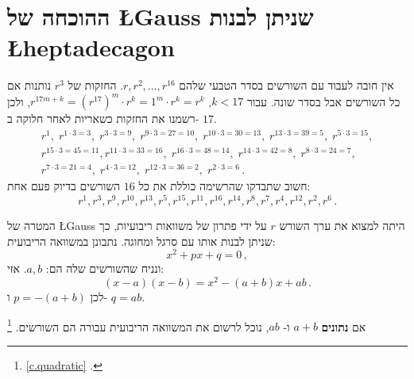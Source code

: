 \section{ההוכחה של 
\L{Gauss}
שניתן לבנות 
\L{heptadecagon}}\label{s.gauss}

אין חובה לעבוד עם השורשים בסדר הטבעי שלהם
$r,r^2,\ldots,r^{16}$. 
החזקות של
$r^3$
נותנות אם כל השורשים אבל בסדר שונה. עבור
$k<17$, $r^{17m+k}=(r^{17})^m\cdot r^k=1^m\cdot r^k=r^k$,
ולכן רשמנו את החזקות כשאריות לאחר חלוקה ב-%
$17$.
\[
\begin{array}{l}
r^1, \;r^{1\cdot 3 =3},\; r^{3\cdot 3=9},\; r^{9\cdot 3=27=10},\; r^{10\cdot 3=30=13},\; r^{13\cdot 3=39=5},\; r^{5\cdot 3=15},\\ r^{15\cdot 3=45=11},
r^{11\cdot 3 =33=16}, \;r^{16\cdot 3=48=14},\; r^{14\cdot 3=42=8},\; r^{8\cdot 3=24=7},\\r^{7\cdot 3=21=4},\; r^{4\cdot 3=12},\; r^{12\cdot 3=36=2},\; r^{2\cdot 3=6}\,.
\end{array}
\]
חשוב שתבדקו שהרשימה כוללת את כל 
$16$
השורשים בדיוק פעם אחת:
\begin{equation}\label{eq.roots}
r^1, r^3, r^9, r^{10}, r^{13}, r^5, r^{15}, r^{11}, r^{16}, r^{14}, r^8, r^7, r^4, r^{12}, r^2, r^6\,.
\end{equation}


המטרה של
\L{Gauss}
היתה למצוא את ערך השורש
$r$
על ידי פתרון של משוואות ריבועיות, כך שניתן לבנות אותו עם סרגל ומחוגה. נתבונן במשוואה הריבועית:
\[
x^2+px+q=0\,,
\]
ונניח שהשורשים שלה הם:
$a,b$.
אזי:
\[
(x-a)(x-b)=x^2 - (a+b)x + ab\,.
\]
לכן
$p=-(a+b)$
ו-%
$q=ab$.

אם
\textbf{נתונים}
$a+b$
ו-%
$ab$,
נוכל לרשום את המשוואה הריבועית עבורה הם השורשים.%
\footnote{
\ref{c.quadratic}
.}

